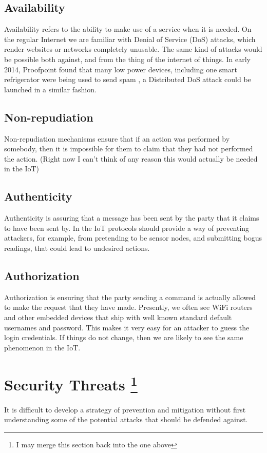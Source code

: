 \documentclass[10pt,journal,compsoc]{IEEEtran}
\begin{document}
\subsection{Availability}
Availability refers to the ability to make use of a service when it is needed.
On the regular Internet we are familiar with Denial of Service (DoS) attacks,
which render websites or networks completely unusable. The same kind of attacks
would be possible both against, and from the thing of the internet of things.
In early 2014, Proofpoint found that many low power devices, including one
smart refrigerator were being used to send spam \cite{Proofpoint2014}, a
Distributed DoS attack could be launched in a similar fashion.  

\subsection{Non-repudiation}
Non-repudiation mechanisms ensure that if an action was performed by somebody,
then it is impossible for them to claim that they had not performed the action.
(Right now I can't think of any reason this would actually be needed in the
IoT) 

\subsection{Authenticity}
Authenticity is assuring that a message has been sent by the party that it
claims to have been sent by. In the IoT protocols should provide a way of
preventing attackers, for example, from pretending to be sensor nodes, and
submitting bogus readings, that could lead to undesired actions.  

\subsection{Authorization}
Authorization is ensuring that the party sending a command is actually allowed
to make the request that they have made. Presently, we often see WiFi routers
and other embedded devices that ship with well known standard default usernames
and password. This makes it very easy for an attacker to guess the login
credentials. If things do not change, then we are likely to see the same
phenomenon in the IoT. 


\section{Security Threats \footnote{I may merge this section back into the one above} }
It is difficult to develop a strategy of prevention and mitigation without
first understanding some of the potential attacks that should be defended
against.  
\end{document}
